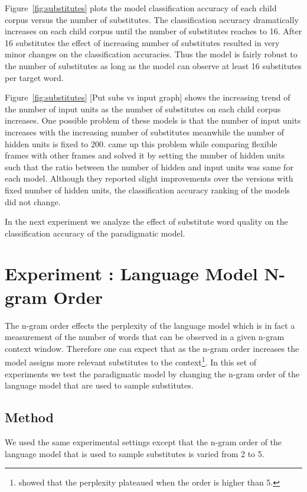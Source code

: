 Figure~\ref{fig:substitutes} plots the model classification accuracy of each
child corpus versus the number of substitutes.  The classification accuracy
dramatically increases on each child corpus until the number of substitutes
reaches to 16.   After 16 substitutes the effect of increasing number of
substitutes resulted in very minor changes on the classification accuracies.
Thus the model is fairly robust to the number of substitutes as long as the
model can observe at least 16 substitutes per target word.  

Figure~\ref{fig:substitutes} [Put subs vs input graph] shows the increasing
trend of the number of input units as the number of substitutes on each child
corpus increases.  One possible problem of these models is that the number of
input units increases with the increasing number of substitutes meanwhile the
number of hidden units is fixed to 200.   \cite{clair2010} came up this problem
while comparing flexible frames with other frames and solved it by setting the
number of hidden units such that the ratio between the number of hidden and
input units was same for each model.  Although they reported slight
improvements over the versions with fixed number of hidden units, the
classification accuracy ranking of the models did not change. 

In the next experiment we analyze the effect of substitute word quality on the
classification accuracy of the paradigmatic model.

\section{Experiment : Language Model N-gram Order}
\label{s:exp_ngram}
The n-gram order effects the perplexity of the language model which is in fact
a measurement of the number of words that can be observed in a given n-gram
context window.  Therefore one can expect that as the n-gram order increases
the model assigns more relevant substitutes to the
context\footnote{\cite{Goodman2001403} showed that the perplexity plateaued when
the order is higher than 5.}.  In this set of experiments we test the
paradigmatic model by changing the n-gram order of the language model that are
used to sample substitutes.

\subsection{Method}
We used the same experimental settings except that the n-gram order of the
language model that is used to sample substitutes is varied from 2 to
5. 

